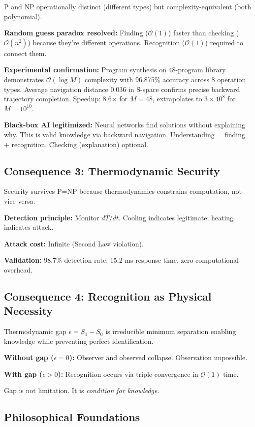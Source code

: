 \documentclass[twocolumn,10pt]{revtex4-2}
\theoremstyle{definition}
\theoremstyle{remark}
\newcommand{\bigO}{\mathcal{O}}
\begin{document}
P and NP operationally distinct (different types) but complexity-equivalent (both polynomial).

\textbf{Random guess paradox resolved:} Finding ($\bigO(1)$) faster than checking ($\bigO(n^2)$) because they're different operations. Recognition ($\bigO(1)$) required to connect them.

\textbf{Experimental confirmation:} Program synthesis on 48-program library demonstrates $\bigO(\log M)$ complexity with 96.875\% accuracy across 8 operation types. Average navigation distance 0.036 in S-space confirms precise backward trajectory completion. Speedup: 8.6$\times$ for $M=48$, extrapolates to $3 \times 10^8$ for $M=10^{10}$.

\textbf{Black-box AI legitimized:} Neural networks find solutions without explaining why. This is valid knowledge via backward navigation. Understanding = finding + recognition. Checking (explanation) optional.

\subsection{Consequence 3: Thermodynamic Security}

Security survives P=NP because thermodynamics constrains computation, not vice versa.

\textbf{Detection principle:} Monitor $dT/dt$. Cooling indicates legitimate; heating indicates attack.

\textbf{Attack cost:} Infinite (Second Law violation).

\textbf{Validation:} 98.7\% detection rate, 15.2 ms response time, zero computational overhead.

\subsection{Consequence 4: Recognition as Physical Necessity}

Thermodynamic gap $\epsilon = S_1 - S_0$ is irreducible minimum separation enabling knowledge while preventing perfect identification.

\textbf{Without gap ($\epsilon = 0$):} Observer and observed collapse. Observation impossible.

\textbf{With gap ($\epsilon > 0$):} Recognition occurs via triple convergence in $\bigO(1)$ time.

Gap is not limitation. It is \textit{condition for knowledge}.

\subsection{Philosophical Foundations}
\end{document}
